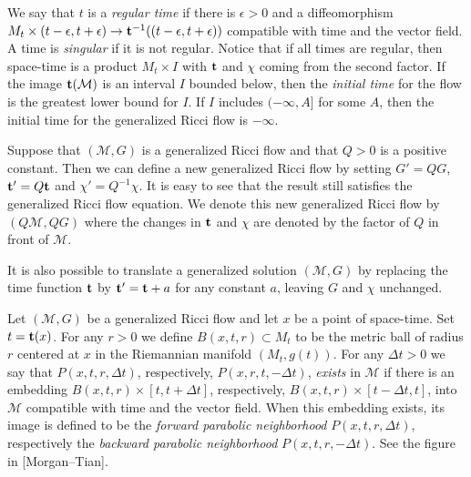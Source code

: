 \begin{definition}\label{def:regular-singular-time}
We say that $t$ is a {\em regular time} if there is $\epsilon>0$ and
a diffeomorphism $M_{t}\times (t-\epsilon,t+\epsilon)\to {\bf
t}^{-1}((t-\epsilon,t+\epsilon))$ compatible with time
and the vector field. A time is {\em singular} if it is not regular.
Notice that if all times are regular, then space-time is a product
$M_{t}\times I$ with ${\bf t}$ and $\chi$ coming from the second
factor. If the image ${\bf t}({\mathcal M})$ is an interval $I$
bounded below, then the {\em initial time} for the flow is the
greatest lower bound for $I$. If $I$ includes $(-\infty,A]$ for some
$A$, then the initial time for the generalized Ricci flow is
$-\infty$.
\end{definition}



\begin{definition}\label{def:scaling-translation}
Suppose that $({\mathcal M},G)$ is a generalized Ricci flow and that
$Q>0$ is a positive constant. Then we can define a new generalized
Ricci flow by setting $G'=QG$, ${\bf t'}=Q{\bf t}$ and
$\chi'=Q^{-1}\chi$. It is easy to see that the result still
satisfies the generalized Ricci flow equation. We denote this new
generalized Ricci flow by $(Q{\mathcal M},QG)$ where the changes in
${\bf t}$ and $\chi$ are denoted by the factor of $Q$ in front of
${\mathcal M}$.

It is also possible to translate a generalized solution $({\mathcal M},G)$ by
replacing the time function ${\bf t}$ by ${\bf t'}={\bf t}+a$ for any constant
$a$, leaving $G$ and $\chi$ unchanged.
\end{definition}




\begin{definition}\label{def:parabolic-neighborhoods}
Let $({\mathcal M},G)$ be a generalized Ricci flow and let $x$ be a
point of space-time. Set $t={\bf t}(x)$. For any  $r>0$ we define
$B(x,t,r)\subset M_t$ to be the metric ball of radius $r$ centered
at $x$ in the Riemannian manifold $(M_t,g(t))$. For any $\Delta t>0$
we say that $P(x,t,r,\Delta t)$,
respectively, $P(x,r,t,-\Delta
t)$, {\em exists} in ${\mathcal M}$ if there is an embedding
$B(x,t,r)\times [t,t+\Delta t]$, respectively, $B(x,t,r)\times
[t-\Delta t,t]$, into ${\mathcal M}$ compatible with time and the
vector field. When this embedding exists, its image is defined to be the {\em
forward parabolic neighborhood}
$P(x,t,r,\Delta t)$, respectively the {\em backward parabolic
neighborhood} $P(x,t,r,-\Delta t)$.
See the figure in [Morgan--Tian].
\end{definition}


